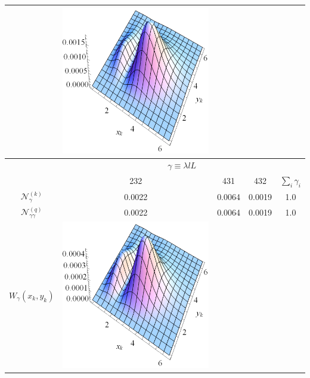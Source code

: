 \documentclass[12pt,a4paper,twoside]{article}
\begin{document}
\begin{table}[]
\begin{tabular}{@{}ccccc@{}}
&\includegraphics[scale=0.5]{W1_4}                   
\\ \midrule
                                    & \multicolumn{4}{c}{$\gamma \equiv \lambda l L$} \\ 
                                    & 232     & 431     & 432     & $\sum_i \gamma_i$ \\ \midrule
$\mathcal{N}_{\gamma}^{(k)}$        & 0.0022  & 0.0064  & 0.0019  & 1.0               \\
$\mathcal{N}_{\gamma \gamma}^{(q)}$ & 0.0022  & 0.0064  & 0.0019  & 1.0               \\
$W_{\gamma}\left(x_k,y_k\right)$    
&\includegraphics[scale=0.5]{W1_5}         

\end{tabular}
\end{table}
\end{document}
